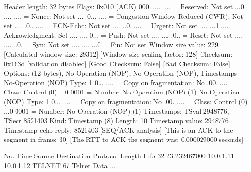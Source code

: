     Header length: 32 bytes
    Flags: 0x010 (ACK)
        000. .... .... = Reserved: Not set
        ...0 .... .... = Nonce: Not set
        .... 0... .... = Congestion Window Reduced (CWR): Not set
        .... .0.. .... = ECN-Echo: Not set
        .... ..0. .... = Urgent: Not set
        .... ...1 .... = Acknowledgment: Set
        .... .... 0... = Push: Not set
        .... .... .0.. = Reset: Not set
        .... .... ..0. = Syn: Not set
        .... .... ...0 = Fin: Not set
    Window size value: 229
    [Calculated window size: 29312]
    [Window size scaling factor: 128]
    Checksum: 0x163d [validation disabled]
        [Good Checksum: False]
        [Bad Checksum: False]
    Options: (12 bytes), No-Operation (NOP), No-Operation (NOP), Timestamps
        No-Operation (NOP)
            Type: 1
                0... .... = Copy on fragmentation: No
                .00. .... = Class: Control (0)
                ...0 0001 = Number: No-Operation (NOP) (1)
        No-Operation (NOP)
            Type: 1
                0... .... = Copy on fragmentation: No
                .00. .... = Class: Control (0)
                ...0 0001 = Number: No-Operation (NOP) (1)
        Timestamps: TSval 2948776, TSecr 8521403
            Kind: Timestamp (8)
            Length: 10
            Timestamp value: 2948776
            Timestamp echo reply: 8521403
    [SEQ/ACK analysis]
        [This is an ACK to the segment in frame: 30]
        [The RTT to ACK the segment was: 0.000029000 seconds]

No.     Time           Source                Destination           Protocol Length Info
     32 23.232467000   10.0.1.11             10.0.1.12             TELNET   67     Telnet Data ...

